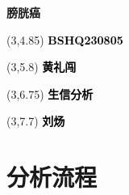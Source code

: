 \documentclass[
  ignorenonframetext,
]{beamer}
\author{}
\date{\vspace{-2.5em}}
\begin{document}
\begin{frame}
\begin{titlepage} 
\begin{center} \textbf{\huge 膀胱癌}
\vspace{4em} \begin{textblock}{10}(3,4.85) \Large
\textbf{\textcolor{black}{BSHQ230805}}
\end{textblock} \begin{textblock}{10}(3,5.8)
\Large \textbf{\textcolor{black}{黄礼闯}}
\end{textblock} \begin{textblock}{10}(3,6.75)
\Large
\textbf{\textcolor{black}{生信分析}}
\end{textblock} \begin{textblock}{10}(3,7.7)
\Large
\textbf{\textcolor{black}{刘炀}}
\end{textblock} \end{center} \end{titlepage}
\restoregeometry


\begin{center}\vspace{1.5cm}\end{center}\tableofcontents

\begin{center}\vspace{1.5cm}\end{center}\listoffigures

\begin{center}\vspace{1.5cm}\end{center}\listoftables



\end{frame}

\hypertarget{abstract}{%
\section{分析流程}\label{abstract}}
\end{document}
